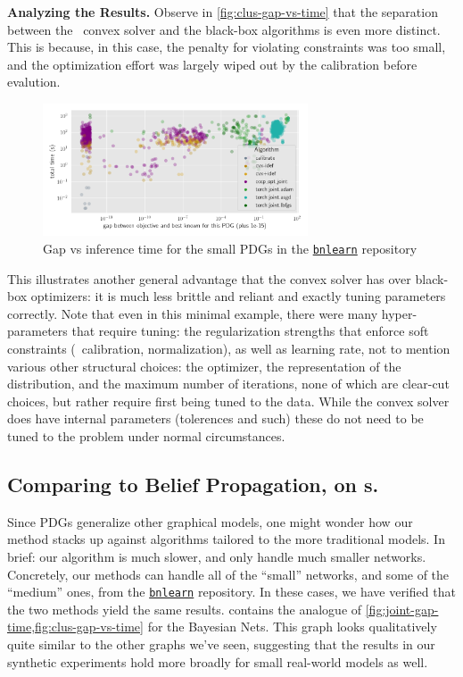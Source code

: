 \begin{subappendices}
\textbf{Analyzing the Results.}
Observe in \cref{fig:clus-gap-vs-time} that the separation between the \actree\ convex solver and the black-box algorithms is even more distinct. This is because, in this case, the penalty for violating constraints was too small, and the optimization effort was largely wiped out by the calibration before evalution.


\begin{figure}
    \centering
    \includegraphics[width=0.7\textwidth]{figs/bn/gap-v-time}
    \caption{Gap vs inference time for the small PDGs in the \href{https://www.bnlearn.com/bnrepository/}{\texttt{bnlearn}} repository}
    \label{fig:bn-gap-v-time}
\end{figure}

This illustrates another general advantage that the convex solver has over black-box optimizers: it is much less brittle and reliant and exactly tuning parameters correctly. Note that even in this minimal example, there were many hyper-parameters that require tuning:
the regularization strengths that enforce soft constraints (\actree\ calibration, normalization), as well as learning rate, not to mention
various other structural choices: the optimizer, the representation of the distribution, and the maximum number of iterations, none of which are clear-cut choices, but rather require first being tuned to the data.
While the convex solver does have internal parameters (tolerences and such) these do not need to be tuned to the problem under normal circumstances.

\subsection{Comparing to Belief Propagation, on \AcTree s.}
    \label{sec:bn-expt-details}
 Since PDGs generalize other graphical models, one might wonder how our method stacks up against algorithms tailored to the more traditional models. In brief: our algorithm is much slower, and only handle much smaller networks.
 Concretely, our methods can handle all of the ``small'' networks, and some of the ``medium'' ones, from the \href{https://www.bnlearn.com/bnrepository/}{\texttt{bnlearn}} repository.
  In these cases, we have verified that the two methods yield the same results.
   contains the analogue of \cref{fig:joint-gap-time,fig:clus-gap-vs-time}
  for the Bayesian Nets. This graph looks qualitatively quite similar to the other graphs we've seen, suggesting that the results in our synthetic experiments hold more broadly for small real-world models as well.





\end{subappendices}
